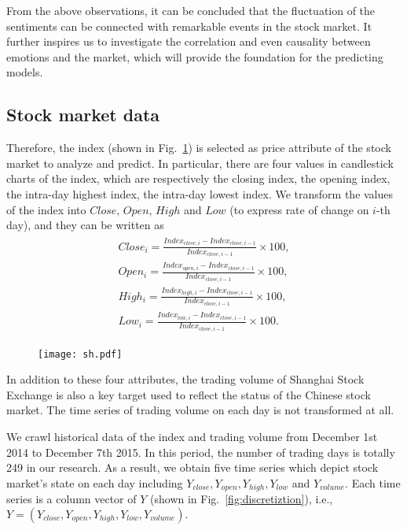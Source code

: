 \documentclass[aps,preprint,groupedaddress]{revtex4-1}
\begin{document}
From the above observations, it can be concluded that the fluctuation of the sentiments can be connected with remarkable events in the stock market. It further inspires us to investigate the correlation and even causality between emotions and the market, which will provide the foundation for the predicting models.

\subsection{Stock market data}

{\color{black}{The economists and traders consider the Shanghai Stock Exchange Composite Index as reflecting the overall status of the Chinese stock market.}} Therefore, the index (shown in Fig.~\ref{fig:sh}) is selected as price attribute of the stock market to analyze and predict. In particular, there are four values in candlestick charts of the index, which are respectively the closing index, the opening index, the intra-day highest index, the intra-day lowest index. We transform the values of the index into $Close$, $Open$, $High$ and $Low$ (to express rate of change on $i$-th day), and they can be written as
\begin{gather}
\begin{split}
 Close_{i} = \frac{Index_{close,i}-Index_{close,i-1}}{Index_{close,i-1}} \times 100, \\
 Open_{i} = \frac{Index_{open,i}-Index_{close,i-1}}{Index_{close,i-1}} \times 100, \\
 High_{i} = \frac{Index_{high,i}-Index_{close,i-1}}{Index_{close,i-1}} \times 100, \\
 Low_{i} = \frac{Index_{low,i}-Index_{close,i-1}}{Index_{close,i-1}} \times 100.
\end{split}
\end{gather}

\begin{figure}
\centering
\texttt{[image: sh.pdf]}
\caption{{\color{black}{Shanghai Stock Exchange Composite Index from December 2014 to December 2015.}}}
\label{fig:sh}
\end{figure}

In addition to these four attributes, the trading volume of Shanghai Stock Exchange is also a key target used to reflect the status of the Chinese stock market. The time series of trading volume on each day is not transformed at all. 

We crawl historical data of the index and trading volume from December 1st 2014 to December 7th 2015. In this period, the number of trading days is totally 249 in our research. As a result, we obtain five time series which depict stock market's state on each day including $Y_{close}, Y_{open}, Y_{high}, Y_{low}$ and $Y_{volume}$. Each time series is a column vector of $Y$ (shown in Fig.~\ref{fig:discretiztion}), i.e., $Y = (Y_{close}, Y_{open}, Y_{high}, Y_{low}, Y_{volume}).$
\end{document}
